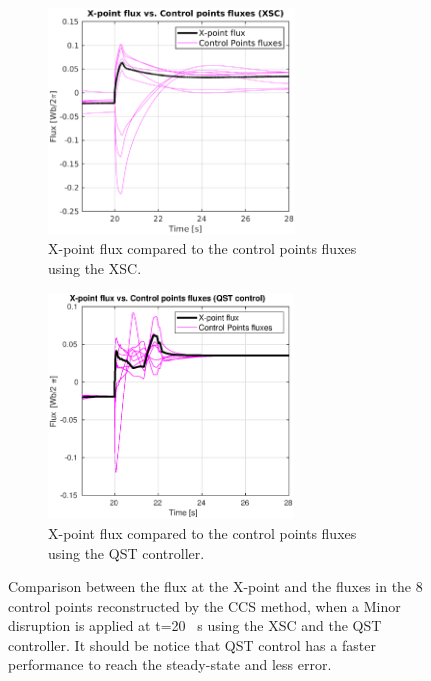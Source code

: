 \begin{figure}[h]
	\centering
	\begin{subfigure}[b]{0.32\textwidth}
		\includegraphics[height=6cm] {Chp3/Results_iso/8_gaps_XpointVSpoinsFlux_mnr_dsrp.eps}  
		\caption{ X-point flux compared to the control points fluxes using the XSC.
			\label{XpointVScntrlpointsXSC} }
	\end{subfigure}
	\hspace{2 cm}
	\begin{subfigure}[b]{0.32\textwidth}
		\includegraphics[height=6cm] {Chp3/Results_iso/8_gaps_Xpoint_flux_comparFBC.eps}  
		\caption{ X-point flux compared to the control points fluxes using the QST controller.
			\label{XpointVScntrlpointsFBC} }
	\end{subfigure}
\caption{Comparison between the flux at the X-point and the fluxes in the 8 control points reconstructed by the CCS method, when a Minor disruption is applied at t=20 ~s using the XSC and the QST controller. It should be notice that QST control has a faster performance to reach the steady-state and less error. } \label{XpointFluxes}
\end{figure}


